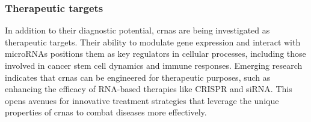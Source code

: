 \subsubsection{Therapeutic targets}
In addition to their diagnostic potential, \gls{crna}s are being investigated
as therapeutic targets.
Their ability to modulate gene expression and interact with microRNAs positions
them as key regulators in cellular processes, including those involved in
cancer stem cell dynamics and immune responses\supercite{cheng_emerging_2023}.
Emerging research indicates that \gls{crna}s can be engineered for therapeutic
purposes, such as enhancing the efficacy of RNA-based therapies like CRISPR and
siRNA\supercite{wesselhoeft_engineering_2018}.
This opens avenues for innovative treatment strategies that leverage the unique
properties of \gls{crna}s to combat diseases more effectively.
